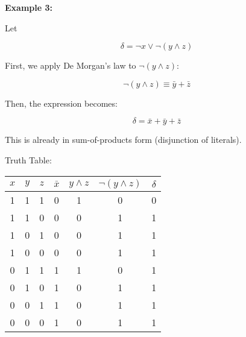 \documentclass[12pt,a4paper,openany]{article}
\begin{document}
\textbf{Example 3:}

Let

$$\delta = \neg x \lor \neg(y \land z)$$

First, we apply De Morgan's law to $\neg(y \land z)$:

$$\neg(y \land z) \equiv \bar{y} + \bar{z}$$

Then, the expression becomes:

$$
\delta = \bar{x} + \bar{y} + \bar{z}
$$

This is already in sum-of-products form (disjunction of literals).

Truth Table: 

\begin{center}
\begin{tabular}{|c|c|c|c|c|c|c|}
\hline
$x$ & $y$ & $z$ & $\bar{x}$ & $y \land z$ & $\neg(y \land z)$ & $\delta$ \\
\hline
1 & 1 & 1 & 0 & 1 & 0 & 0 \\
\hline
1 & 1 & 0 & 0 & 0 & 1 & 1 \\
\hline
1 & 0 & 1 & 0 & 0 & 1 & 1 \\
\hline
1 & 0 & 0 & 0 & 0 & 1 & 1 \\
\hline
0 & 1 & 1 & 1 & 1 & 0 & 1 \\
\hline
0 & 1 & 0 & 1 & 0 & 1 & 1 \\
\hline
0 & 0 & 1 & 1 & 0 & 1 & 1 \\
\hline
0 & 0 & 0 & 1 & 0 & 1 & 1 \\
\hline
\end{tabular}
\end{center}
\end{document}
